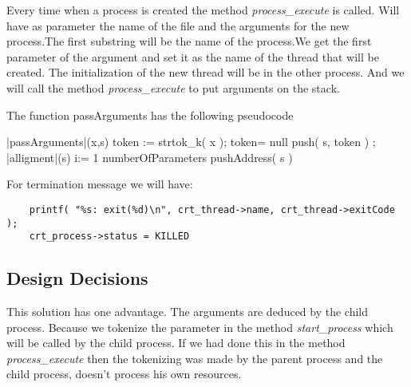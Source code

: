 	  Every time when a process is created the method \textit{process\_execute} is called. Will have as parameter the name of the file and the arguments for the new process.The first substring will be the name of the process.We get the first parameter of the argument and set it as the name of the thread that will be created. The initialization of the new thread will be in the other process. And we will call the method \textit{process\_execute} to put arguments on the stack.

	  The function passArguments has the following pseudocode


    \begin{program}
    \BEGIN %
    \PROC |passArguments|(x,s) \BODY
              \DO
		token := strtok\_k( x );
		\IF token= null 
		  \THEN {} 
		  \ELSE push( s, token )   
		\FI;
	      \OD
	      |alligment|(s)
              \FOR i:= 1 \TO numberOfParameters  \DO
		pushAddress( s ) \OD
     \ENDPROC
    \END
    \end{program}

    For termination message we will have:

    \begin{lstlisting}
	printf( "%s: exit(%d)\n", crt_thread->name, crt_thread->exitCode );
	crt_process->status = KILLED
    \end{lstlisting}


    \subsection{Design Decisions}

	This solution has one advantage. The arguments are deduced by the child process. Because we tokenize the parameter in the method \textit{start\_process} which will be called by the child process. If we had done this in the method \textit{process\_execute} then the tokenizing was made by the parent process and the child process, doesn't process his own resources.

